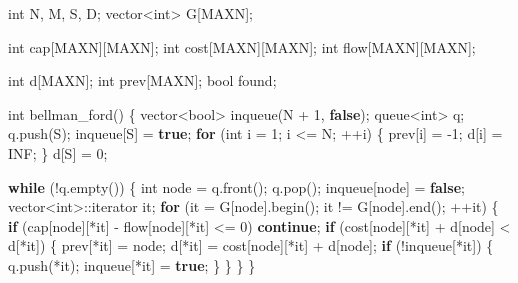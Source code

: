 \documentclass[10pt,]{article}
\newenvironment{Shaded}{}{}
\newcommand{\KeywordTok}[1]{\textcolor[rgb]{0.00,0.44,0.13}{\textbf{{#1}}}}
\newcommand{\DataTypeTok}[1]{\textcolor[rgb]{0.56,0.13,0.00}{{#1}}}
\newcommand{\DecValTok}[1]{\textcolor[rgb]{0.25,0.63,0.44}{{#1}}}
\newcommand{\NormalTok}[1]{{#1}}
\begin{document}
\begin{Shaded}
\begin{Highlighting}[]
\DataTypeTok{int} \NormalTok{N, M, S, D;}
\NormalTok{vector<}\DataTypeTok{int}\NormalTok{> G[MAXN];}

\DataTypeTok{int} \NormalTok{cap[MAXN][MAXN];}
\DataTypeTok{int} \NormalTok{cost[MAXN][MAXN];}
\DataTypeTok{int} \NormalTok{flow[MAXN][MAXN];}

\DataTypeTok{int} \NormalTok{d[MAXN];}
\DataTypeTok{int} \NormalTok{prev[MAXN];}
\DataTypeTok{bool} \NormalTok{found;}

\DataTypeTok{int} \NormalTok{bellman_ford() \{}
  \NormalTok{vector<}\DataTypeTok{bool}\NormalTok{> inqueue(N + }\DecValTok{1}\NormalTok{, }\KeywordTok{false}\NormalTok{);}
  \NormalTok{queue<}\DataTypeTok{int}\NormalTok{> q;}
  \NormalTok{q.push(S);}
  \NormalTok{inqueue[S] = }\KeywordTok{true}\NormalTok{;}
  \KeywordTok{for} \NormalTok{(}\DataTypeTok{int} \NormalTok{i = }\DecValTok{1}\NormalTok{; i <= N; ++i) \{}
    \NormalTok{prev[i] = -}\DecValTok{1}\NormalTok{;}
    \NormalTok{d[i] = INF;}
  \NormalTok{\}}
  \NormalTok{d[S] = }\DecValTok{0}\NormalTok{;}

  \KeywordTok{while} \NormalTok{(!q.empty()) \{}
    \DataTypeTok{int} \NormalTok{node = q.front();}
    \NormalTok{q.pop();}
    \NormalTok{inqueue[node] = }\KeywordTok{false}\NormalTok{;}
    \NormalTok{vector<}\DataTypeTok{int}\NormalTok{>::iterator it;}
    \KeywordTok{for} \NormalTok{(it = G[node].begin(); it != G[node].end(); ++it) \{}
      \KeywordTok{if} \NormalTok{(cap[node][*it] - flow[node][*it] <= }\DecValTok{0}\NormalTok{)}
        \KeywordTok{continue}\NormalTok{;}
      \KeywordTok{if} \NormalTok{(cost[node][*it] + d[node] < d[*it]) \{}
        \NormalTok{prev[*it] = node;}
        \NormalTok{d[*it] = cost[node][*it] + d[node];}
        \KeywordTok{if} \NormalTok{(!inqueue[*it]) \{}
          \NormalTok{q.push(*it);}
          \NormalTok{inqueue[*it] = }\KeywordTok{true}\NormalTok{;}
        \NormalTok{\}}
      \NormalTok{\}}
    \NormalTok{\}}
  \NormalTok{\}}


\end{Highlighting}
\end{Shaded}
\end{document}
